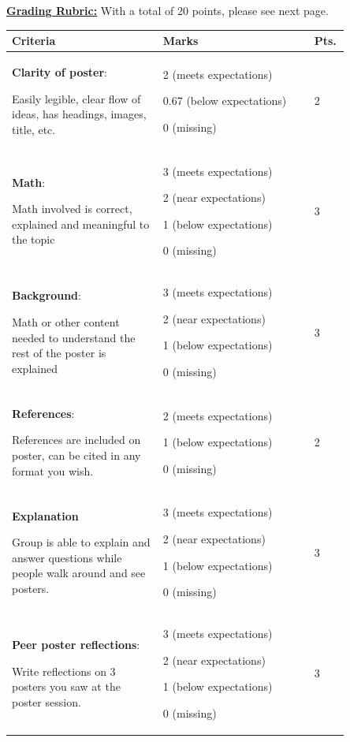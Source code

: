 \documentclass[12pt]{article}
\begin{document}
\textbf{\underline{Grading Rubric:}} With a total of 20 points, please see next page.
\begin{table}[h!]
    \centering
    \begin{tabular}{p{0.4\linewidth}p{0.4\linewidth}p{0.05\linewidth}}\toprule
        \textbf{Criteria} & \textbf{Marks} & \textbf{Pts.}\\ \midrule
        {\textbf{Clarity of poster}:\par Easily legible, clear flow of ideas, has headings, images, title, etc.}& 2 (meets expectations)\par 0.67 (below expectations)\par 0 (missing)& 2\\\midrule
        \textbf{Math}:\par Math involved is correct,  explained and meaningful to the topic& 3 (meets expectations)\par 2 (near expectations)\par 1 (below expectations)\par 0 (missing) & 3\\\midrule
        \textbf{Background}:\par Math or other content needed to understand the rest of the poster is explained & 3 (meets expectations)\par 2 (near expectations)\par 1 (below expectations)\par 0 (missing) & 3\\\midrule
        \textbf{References}:\par References are included on poster, can be cited in any format you wish. & 2 (meets expectations)\par 1 (below expectations)\par 0 (missing)& 2\\\midrule
        \textbf{Explanation}\par Group is able to explain and answer questions while people walk around and see posters.&3 (meets expectations)\par 2 (near expectations)\par 1 (below expectations)\par 0 (missing) & 3\\\midrule
        \textbf{Peer poster reflections}:\par Write reflections on $3$ posters you saw at the poster session.& 3 (meets expectations)\par 2 (near expectations)\par 1 (below expectations)\par 0 (missing) & 3\\\midrule

\end{tabular}
\end{table}
\end{document}
